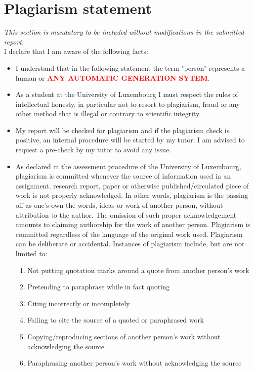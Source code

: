 \documentclass[conference,compsoc]{IEEEtran}
\begin{document}
    \section*{Plagiarism statement}
{\it This section is mandatory to be included without modifications in the submitted report.}\\

I declare that I am aware of the following facts:
\begin{itemize}
    \item I understand that in the following statement the term "person" represents a human or \textbf{\textcolor{red}{ANY AUTOMATIC GENERATION SYTEM}}.
	\item As a student at the University of Luxembourg I must respect the rules of intellectual honesty, in particular not to resort to plagiarism, fraud or any other method that is illegal or contrary to scientific integrity.
	\item My report will be checked for plagiarism and if the plagiarism check is positive, an internal procedure will be started by my tutor. I am advised to request a pre-check by my tutor to avoid any issue.
	\item As declared in the assessment procedure of the University of Luxembourg, plagiarism is committed whenever the source of information used in an assignment, research report, paper or otherwise published/circulated piece of work is not properly acknowledged. In other words, plagiarism is the passing off as one’s own the words, ideas or work of another person, without attribution to the author. The omission of such proper acknowledgement amounts to claiming authorship for the work of another person. Plagiarism is committed regardless of the language of the original work used. Plagiarism can be deliberate or accidental.
Instances of plagiarism include, but are not limited to:
\begin{enumerate}
  \item Not putting quotation marks around a quote from another person’s work
  \item Pretending to paraphrase while in fact quoting
  \item Citing incorrectly or incompletely
  \item Failing to cite the source of a quoted or paraphrased work
  \item Copying/reproducing sections of another person’s work without acknowledging the source
  \item Paraphrasing another person’s work without acknowledging the source

\end{enumerate}
\end{itemize}
\end{document}
